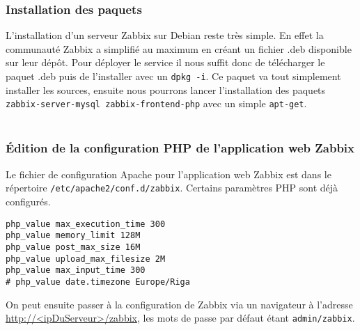 		\subsubsection{Installation des paquets}
			\vspace{0.3cm}

		L'installation d'un serveur Zabbix sur Debian reste très simple. En effet la communauté Zabbix a simplifié au maximum en créant un fichier .deb disponible sur leur dépôt. Pour déployer le service il nous suffit donc de télécharger le paquet .deb puis de l'installer avec un \verb?dpkg -i?. Ce paquet va tout simplement installer les sources, ensuite nous pourrons lancer l'installation des paquets \verb?zabbix-server-mysql zabbix-frontend-php? avec un simple \verb?apt-get?.\\
		
			\\
		
		\subsubsection{Édition de la configuration PHP de l'application web Zabbix}
			\vspace{0.3cm}
			Le fichier de configuration Apache pour l'application web Zabbix est dans le répertoire \verb?/etc/apache2/conf.d/zabbix?. Certains paramètres PHP sont déjà configurés.\\
\begin{verbatim}		
php_value max_execution_time 300
php_value memory_limit 128M
php_value post_max_size 16M
php_value upload_max_filesize 2M
php_value max_input_time 300
# php_value date.timezone Europe/Riga

\end{verbatim}

			On peut ensuite passer à la configuration de Zabbix via un navigateur à l'adresse \url{http://<ipDuServeur>/zabbix}, les mots de passe par défaut étant \verb?admin/zabbix?.\\

